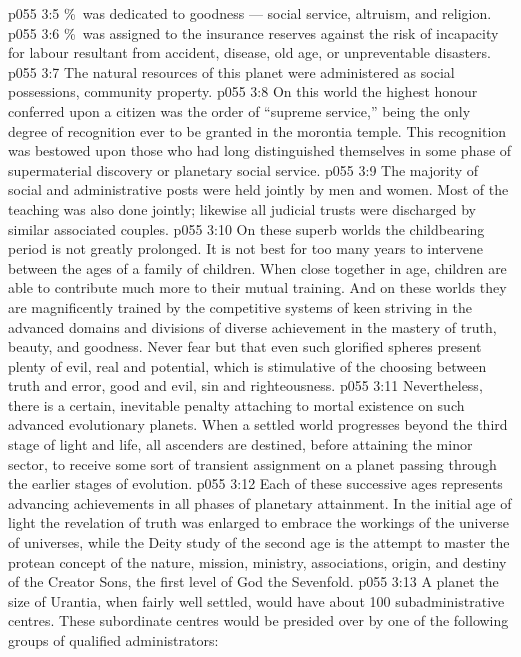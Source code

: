 \vs p055 3:5 \%\ was dedicated to goodness --- social service, altruism, and religion.
\vs p055 3:6 \%\ was assigned to the insurance reserves against the risk of incapacity for labour resultant from accident, disease, old age, or unpreventable disasters.
\vs p055 3:7 \pc The natural resources of this planet were administered as social possessions, community property.
\vs p055 3:8 On this world the highest honour conferred upon a citizen was the order of “supreme service,” being the only degree of recognition ever to be granted in the morontia temple. This recognition was bestowed upon those who had long distinguished themselves in some phase of supermaterial discovery or planetary social service.
\vs p055 3:9 The majority of social and administrative posts were held jointly by men and women. Most of the teaching was also done jointly; likewise all judicial trusts were discharged by similar associated couples.
\vs p055 3:10 \pc On these superb worlds the childbearing period is not greatly prolonged. It is not best for too many years to intervene between the ages of a family of children. When close together in age, children are able to contribute much more to their mutual training. And on these worlds they are magnificently trained by the competitive systems of keen striving in the advanced domains and divisions of diverse achievement in the mastery of truth, beauty, and goodness. Never fear but that even such glorified spheres present plenty of evil, real and potential, which is stimulative of the choosing between truth and error, good and evil, sin and righteousness.
\vs p055 3:11 Nevertheless, there is a certain, inevitable penalty attaching to mortal existence on such advanced evolutionary planets. When a settled world progresses beyond the third stage of light and life, all ascenders are destined, before attaining the minor sector, to receive some sort of transient assignment on a planet passing through the earlier stages of evolution.
\vs p055 3:12 Each of these successive ages represents advancing achievements in all phases of planetary attainment. In the initial age of light the revelation of truth was enlarged to embrace the workings of the universe of universes, while the Deity study of the second age is the attempt to master the protean concept of the nature, mission, ministry, associations, origin, and destiny of the Creator Sons, the first level of God the Sevenfold.
\vs p055 3:13 \pc A planet the size of Urantia, when fairly well settled, would have about 100 subadministrative centres. These subordinate centres would be presided over by one of the following groups of qualified administrators:
